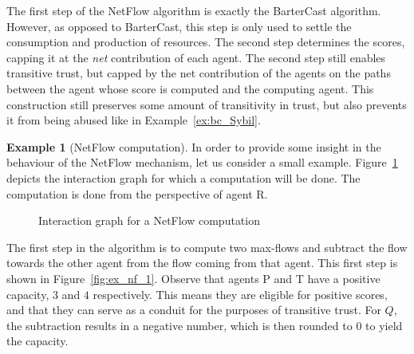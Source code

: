 \documentclass[a4paper,11pt]{book}
\theoremstyle{definition}
\newtheorem{example}{Example}
\begin{document}
The first step of the NetFlow algorithm is exactly the BarterCast algorithm. However,
as opposed to BarterCast, this step is only used to settle the consumption and production
of resources. The second step determines the scores, capping it at the \emph{net} contribution
of each agent. The second step still enables transitive trust, but capped by the net contribution
of the agents on the paths between the agent whose score is computed and the computing agent.
This construction still preserves some amount of transitivity in trust, but also prevents it
from being abused like in Example~\ref{ex:bc_Sybil}.

\begin{example}[NetFlow computation]
 In order to provide some insight in the behaviour of the NetFlow mechanism, let us consider a
small example. Figure~\ref{fig:ex_ig_for_nf} depicts the interaction graph for which a computation
will be done. The computation is done from the perspective of agent R.

\begin{figure}[h]
    \centering
     \caption{Interaction graph for a NetFlow computation}
     \label{fig:ex_ig_for_nf}
\end{figure}

The first step in the algorithm is to compute two max-flows and subtract the flow towards
the other agent from the flow coming from that agent. This first step is shown in Figure~\ref{fig:ex_nf_1}.
Observe that agents P and T have a positive capacity, $3$ and $4$ respectively. 
This means they are eligible for positive
scores, and that they can serve as a conduit for the purposes of transitive trust. For $Q$, the
subtraction results in a negative number, which is then rounded to $0$ to yield the capacity.


\end{example}
\end{document}
